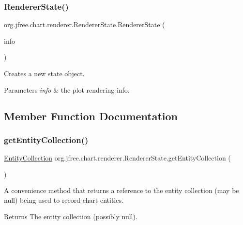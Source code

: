 \subsubsection{\texorpdfstring{Renderer\+State()}{RendererState()}}
{\footnotesize\ttfamily org.\+jfree.\+chart.\+renderer.\+Renderer\+State.\+Renderer\+State (\begin{DoxyParamCaption}\item[{\mbox{\hyperlink{classorg_1_1jfree_1_1chart_1_1plot_1_1_plot_rendering_info}{Plot\+Rendering\+Info}}}]{info }\end{DoxyParamCaption})}

Creates a new state object.


\begin{DoxyParams}{Parameters}
{\em info} & the plot rendering info. \\
\hline
\end{DoxyParams}


\subsection{Member Function Documentation}
\mbox{\label{classorg_1_1jfree_1_1chart_1_1renderer_1_1_renderer_state_ab0b6645c5a83ab1fcc1bbc5c59f111e6}} 
\subsubsection{\texorpdfstring{get\+Entity\+Collection()}{getEntityCollection()}}
{\footnotesize\ttfamily \mbox{\hyperlink{interfaceorg_1_1jfree_1_1chart_1_1entity_1_1_entity_collection}{Entity\+Collection}} org.\+jfree.\+chart.\+renderer.\+Renderer\+State.\+get\+Entity\+Collection (\begin{DoxyParamCaption}{ }\end{DoxyParamCaption})}

A convenience method that returns a reference to the entity collection (may be {\ttfamily null}) being used to record chart entities.

\begin{DoxyReturn}{Returns}
The entity collection (possibly {\ttfamily null}). 
\end{DoxyReturn}
\mbox{\label{classorg_1_1jfree_1_1chart_1_1renderer_1_1_renderer_state_a2f09d95b11e2ded110f0e3a3393ba0c4}} 
